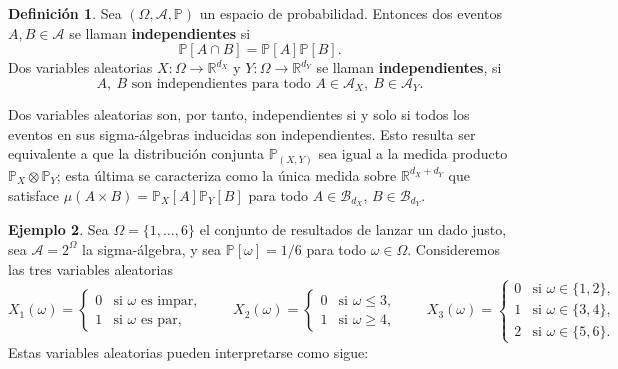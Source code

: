 \documentclass[11pt]{report}
\newenvironment{tcolorbox}[1][]{\par\medskip\noindent\ignorespaces}{\par\medskip}
\theoremstyle{definition}
\newtheorem{definicion}{Definición}[section]
\newtheorem{ejemplo}[definicion]{Ejemplo}
\theoremstyle{plain}
\numberwithin{equation}{section}
\begin{document}
\begin{tcolorbox}[colback=blue!8, colframe=blue!8, boxrule=0pt]
\begin{definicion}
Sea \((\Omega,\mathcal{A},\mathbb{P})\) un espacio de probabilidad. Entonces dos eventos \(A,B\in\mathcal{A}\) se llaman \textbf{independientes} si
\begin{equation*}
    \mathbb{P}[A\cap B]=\mathbb{P}[A]\mathbb{P}[B].
\end{equation*}
Dos variables aleatorias \(X:\Omega\to\mathbb{R}^{d_X}\) y \(Y:\Omega\to\mathbb{R}^{d_Y}\) se llaman \textbf{independientes}, si
\begin{equation*}
    A,\ B \text{ son independientes para todo } A\in\mathcal{A}_X,\ B\in\mathcal{A}_Y.
\end{equation*}
\end{definicion}
\end{tcolorbox}

Dos variables aleatorias son, por tanto, independientes si y solo si todos los eventos en sus sigma-álgebras inducidas son independientes. Esto resulta ser equivalente a que la distribución conjunta \(\mathbb{P}_{(X,Y)}\) sea igual a la medida producto \(\mathbb{P}_X\otimes\mathbb{P}_Y\); esta última se caracteriza como la única medida sobre \(\mathbb{R}^{d_X+d_Y}\) que satisface \(\mu(A\times B)=\mathbb{P}_X[A]\mathbb{P}_Y[B]\) para todo \(A\in\mathcal{B}_{d_X}\), \(B\in\mathcal{B}_{d_Y}\).

\begin{ejemplo}
Sea \(\Omega=\{1,\ldots,6\}\) el conjunto de resultados de lanzar un dado justo, sea \(\mathcal{A}=2^\Omega\) la sigma-álgebra, y sea \(\mathbb{P}[\omega]=1/6\) para todo \(\omega\in\Omega\). Consideremos las tres variables aleatorias
\begin{equation*}
    X_1(\omega)=
    \begin{cases}
        0 & \text{si } \omega \text{ es impar},\\
        1 & \text{si } \omega \text{ es par},
    \end{cases}
    \qquad
    X_2(\omega)=
    \begin{cases}
        0 & \text{si } \omega\leq 3,\\
        1 & \text{si } \omega\geq 4,
    \end{cases}
    \qquad
    X_3(\omega)=
    \begin{cases}
        0 & \text{si } \omega\in\{1,2\},\\
        1 & \text{si } \omega\in\{3,4\},\\
        2 & \text{si } \omega\in\{5,6\}.
    \end{cases}
\end{equation*}
Estas variables aleatorias pueden interpretarse como sigue:
\end{ejemplo}
\end{document}
